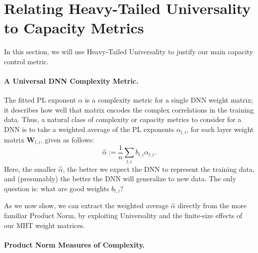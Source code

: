 \section{Relating Heavy-Tailed Universality to Capacity Metrics}
\label{sxn:theory-new}

In this section, we will use Heavy-Tailed Universality to justify our main capacity control metric.

\paragraph{A Universal DNN Complexity Metric.} 

The fitted PL exponent $\alpha$ is a complexity metric for a single DNN weight matrix; it describes how well that matrix encodes the complex correlations in the training data.
Thus, a natural class of complexity or capacity metrics to consider for a DNN is to take a weighted average of the PL exponents $\alpha_{l,i}$, for each layer weight matrix $\mathbf{W}_{l,i}$, given as follows:
\begin{equation}
\hat{\alpha}:=\dfrac{1}{n}\sum_{l,i}b_{l,i}\alpha_{l,i}  .
\label{eqn:alpha_hat_generic}
\end{equation}
Here, the smaller $\hat{\alpha}$, the better we expect the DNN to represent the training data, and (presumably) the better the DNN will generalize to new data.
The only question is: what are good weights $b_{l,i}$?

As we now show, we can extract the weighted average $\hat{\alpha}$ directly from the more familiar Product Norm, by exploiting Universality and the finite-size effects of our MHT weight matrices.


\paragraph{Product Norm Measures of Complexity.} 

